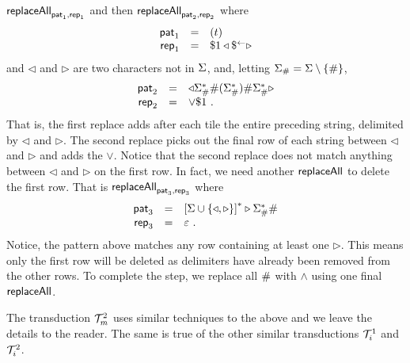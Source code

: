 $\mathsf{replaceAll}_{\mathsf{pat}_1, \mathsf{rep}_1}$ and then $\mathsf{replaceAll}_{\mathsf{pat}_2, \mathsf{rep}_2}$ where
\[
    \begin{array}{rcl}
        \mathsf{pat}_1 &=& (t) \\
        \mathsf{rep}_1 &=& \$1 \triangleleft \$^{\leftarrow} \triangleright
    \end{array}
\]
and $\triangleleft$ and $\triangleright$ are two characters not in $\Sigma$,
and, letting $\Sigma_\# = \Sigma \setminus \{ \# \}$,
\[
    \begin{array}{rcl}
        \mathsf{pat}_2 &=& \triangleleft
                \Sigma_\#^\ast \# (
                    \Sigma_\#^\ast
                ) \# \Sigma_\#^\ast
            \triangleright \\
        \mathsf{rep}_2 &=& \lor \$1 \ .
    \end{array}
\]
That is, the first replace adds after each tile the entire preceding string,
delimited by $\triangleleft$ and $\triangleright$. The second replace picks out
the final row of each string between $\triangleleft$ and $\triangleright$ and
adds the $\lor$. Notice that the second replace does not match anything between
$\triangleleft$ and $\triangleright$ on the first row. In fact, we need another
$\mathsf{replaceAll}$ to delete the first row. That is $\mathsf{replaceAll}_{\mathsf{pat}_3, \mathsf{rep}_3}$
where
\[
    \begin{array}{rcl}
        \mathsf{pat}_3 &=& \left[
            \Sigma \cup \{ \triangleleft, \triangleright \}
            \right]^\ast \triangleright \Sigma_\#^\ast \# \\
        \mathsf{rep}_3 &=& \varepsilon \ .
    \end{array}
\]
Notice, the pattern above matches any row containing at least one
$\triangleright$. This means only the first row will be deleted as delimiters
have already been removed from the other rows.  To complete the step, we
replace all $\#$ with $\land$ using one final $\mathsf{replaceAll}$.

The transduction $\mathcal{T}^2_m$ uses similar techniques to the above and
we leave the details to the reader. The same is true of the other similar
transductions $\mathcal{T}^1_{i}$ and $\mathcal{T}^2_{i}$.

